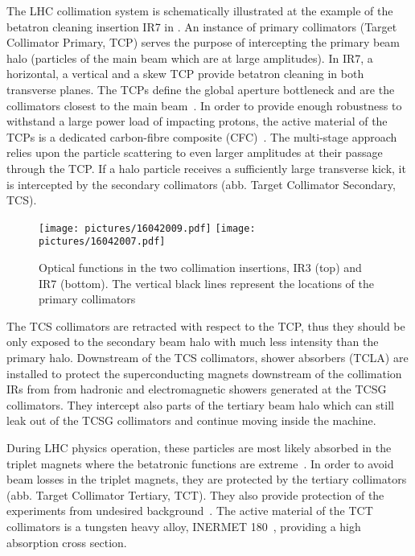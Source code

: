 The LHC collimation system is schematically illustrated at the example of the betatron cleaning insertion IR7 in . An instance of primary collimators (Target Collimator Primary, TCP) serves the purpose of intercepting the primary beam halo (particles of the main beam which are at large amplitudes). In IR7, a horizontal, a vertical and a skew TCP provide betatron cleaning in both transverse planes. The TCPs define the global aperture bottleneck and are the collimators closest to the main beam~\citedr. In order to provide enough robustness to withstand a large power load of impacting protons, the active material of the TCPs is a dedicated carbon-fibre composite (CFC)~\citedr. The multi-stage approach relies upon the particle scattering to even larger amplitudes at their passage through the TCP. If a halo particle receives a sufficiently large transverse kick, it is intercepted by the secondary collimators (abb. Target Collimator Secondary, TCS). 




% 
\begin{figure}[t]  
    \centering
    \texttt{[image: pictures/16042009.pdf]}
    \texttt{[image: pictures/16042007.pdf]}
    \caption{Optical functions in the two collimation insertions, IR3 (top) and IR7 (bottom). The vertical black lines represent the locations of the 
      primary collimators}  
    \label{pic:16042001}
\end{figure}
%
The TCS collimators are retracted with respect to the TCP, thus they should be only exposed to the secondary beam halo with much less intensity than the primary halo. Downstream of the TCS collimators, shower absorbers (TCLA) are installed to protect the superconducting magnets downstream of the collimation IRs from from hadronic and electromagnetic showers generated at the TCSG collimators. They intercept also parts of the tertiary beam halo which can still leak out of the TCSG collimators and continue moving inside the machine. 

During LHC physics operation, these particles are most likely absorbed in the triplet magnets where the betatronic functions are extreme~\cite{ipac2012:MOPPD062}. In order to avoid beam losses in the triplet magnets, they are protected by the tertiary collimators (abb. Target Collimator Tertiary, TCT). They also provide protection of the experiments from undesired background~\cite{Bruce2013825}. The active material of the TCT collimators is a tungsten heavy alloy, INERMET 180~\cite{}, providing a high absorption cross section. 

